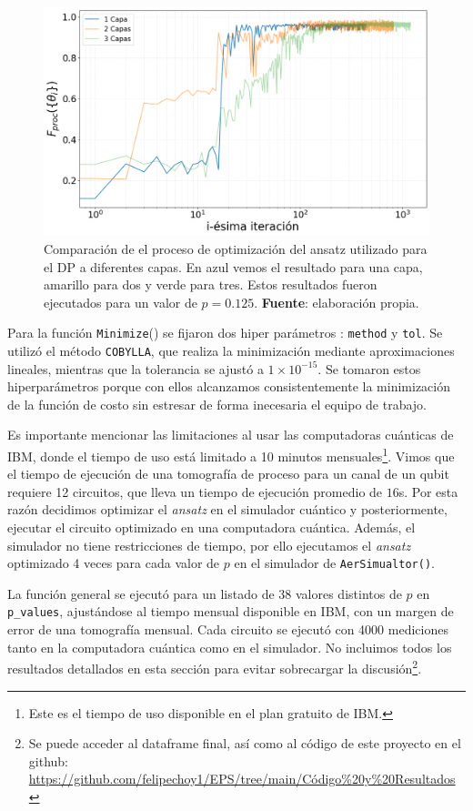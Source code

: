 \documentclass[letterpaper,12pt]{thesisECFM}
\theoremstyle{plain}
\theoremstyle{definition}
\theoremstyle{definition}
\theoremstyle{remark}
\newcommand{\1}{\mathbb{1}}
\begin{document}
\begin{figure}[h!]  %
    \centering 
    \includegraphics[width=0.70 \linewidth]{imagenes/comparacion_capas.png}
    \caption{Comparación de el proceso de optimización del ansatz utilizado
para el DP a diferentes capas. En azul vemos el resultado para una capa,
amarillo para dos y verde para tres. Estos resultados fueron ejecutados para un
valor de $p=0.125$. \textbf{Fuente}: elaboración propia.}
    \label{fig:comparacion_capas}
\end{figure} %


Para la función \texttt{Minimize}() se fijaron dos hiper parámetros :
\texttt{method} y \texttt{tol}. Se utilizó el método \texttt{COBYLLA}, que
realiza la minimización mediante aproximaciones lineales, mientras que la
tolerancia se ajustó a $1\times 10^{-15}$. Se tomaron estos hiperparámetros
porque con ellos alcanzamos consistentemente la minimización de la función de
costo sin estresar de forma inecesaria el equipo de trabajo. 

Es importante mencionar las limitaciones al usar las computadoras cuánticas de
IBM, donde el tiempo de uso está limitado a 10 minutos mensuales\footnote{Este
es el tiempo de uso disponible en el plan gratuito de IBM.}. Vimos que el
tiempo de ejecución de una tomografía de proceso para un canal de un  qubit
requiere 12 circuitos, que lleva un tiempo de ejecución promedio de $16$s. Por
esta razón decidimos optimizar el \textit{ansatz} en el simulador cuántico y
posteriormente, ejecutar el circuito optimizado en una computadora cuántica.
Además, el simulador no tiene restricciones de tiempo, por ello ejecutamos el
\textit{ansatz} optimizado 4 veces para cada valor de $p$ en el simulador de
\texttt{AerSimualtor()}.

La función general se ejecutó para un listado de 38 valores distintos de $p$ en 
\texttt{p\_values}, ajustándose al tiempo mensual disponible en IBM, con un 
margen de error de una tomografía mensual. Cada circuito se ejecutó con 4000 
mediciones tanto en la computadora cuántica como en el simulador.  No incluimos 
todos los resultados detallados en esta sección para evitar sobrecargar la 
discusión\footnote{Se puede acceder al dataframe final, así como al código de 
este proyecto en el github: 
\href{https://github.com/felipechoy1/EPS/tree/main/Código\%20y\%20Resultados}{https://github.com/felipechoy1/EPS/tree/main/Código\%20y\%20Resultados}}.
\end{document}
